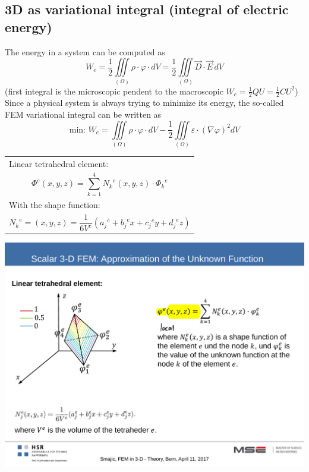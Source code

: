 \subsection{3D as variational integral (integral of electric energy)}
The energy in a system can be computed as
\begin{equation*}
	W_e = \frac{1}{2} \iiint\limits_{\left(\Omega\right)} \rho \cdot \varphi \cdot dV = \frac{1}{2} \iiint\limits_{\left(\Omega	\right)} \vec{D} \cdot \vec{E}\,dV
\end{equation*}
(first integral is the microscopic pendent to the macroscopic $W_e = \frac{1}{2} QU = \frac{1}{2}CU^2$) \newline
Since a physical system is always trying to minimize its energy, the so-called FEM variational integral can be written as
\begin{equation*}
	\textrm{min: } W_e = \iiint\limits_{\left(\Omega\right)} \rho \cdot \varphi \cdot dV - \frac{1}{2} \iiint\limits_{\left(\Omega\right)} \varepsilon \cdot \left(\nabla \varphi\right)^2 dV
\end{equation*}

\begin{minipage}[rt]{12cm}
	\begin{tabular}{l}
		Linear tetrahedral element: \\
		\begin{equation*}
			\Phi^e(x,y,z) = \sum_{k=1}^{4}{N_k}^e(x,y,z) \cdot {\Phi_k}^e
		\end{equation*} \\
		With the shape function: \\
		\begin{equation*}
			{N_k}^e = (x,y,z) = \frac{1}{6 V^e}\left({a_j}^e + {b_j}^e x + {c_j}^e y + {d_j}^e z\right)
		\end{equation*}
	\end{tabular}
\end{minipage}
\begin{minipage}[lt]{8cm}
	\includegraphics[width=.6\textwidth]{./images/tetraheder.pdf}\\
\end{minipage}

